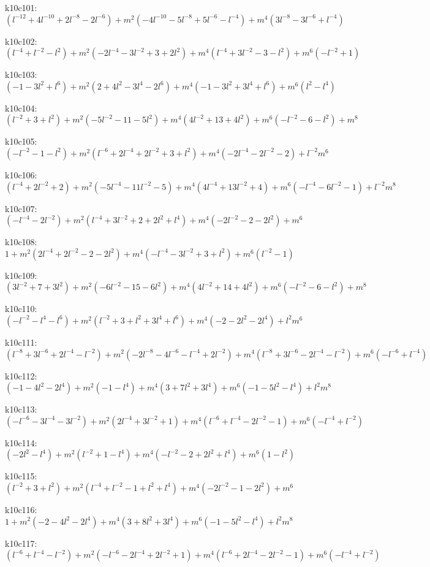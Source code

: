 k10c101: $ (l^{-12}+4l^{-10}+2l^{-8}-2l^{-6})  +m^{2}(-4l^{-10}-5l^{-8}+5l^{-6}-l^{-4})  +m^{4}(3l^{-8}-3l^{-6}+l^{-4}) $ 

k10c102: $ (l^{-4}+l^{-2}-l^{2})  +m^{2}(-2l^{-4}-3l^{-2}+3+2l^{2})  +m^{4}(l^{-4}+3l^{-2}-3-l^{2})  +m^{6}(-l^{-2}+1) $ 

k10c103: $ (-1-3l^{2}+l^{6})  +m^{2}(2+4l^{2}-3l^{4}-2l^{6})  +m^{4}(-1-3l^{2}+3l^{4}+l^{6})  +m^{6}(l^{2}-l^{4}) $ 

k10c104: $ (l^{-2}+3+l^{2})  +m^{2}(-5l^{-2}-11-5l^{2})  +m^{4}(4l^{-2}+13+4l^{2})  +m^{6}(-l^{-2}-6-l^{2})  +m^{8} $ 

k10c105: $ (-l^{-2}-1-l^{2})  +m^{2}(l^{-6}+2l^{-4}+2l^{-2}+3+l^{2})  +m^{4}(-2l^{-4}-2l^{-2}-2)  +l^{-2}m^{6} $ 

k10c106: $ (l^{-4}+2l^{-2}+2)  +m^{2}(-5l^{-4}-11l^{-2}-5)  +m^{4}(4l^{-4}+13l^{-2}+4)  +m^{6}(-l^{-4}-6l^{-2}-1)  +l^{-2}m^{8} $ 

k10c107: $ (-l^{-4}-2l^{-2})  +m^{2}(l^{-4}+3l^{-2}+2+2l^{2}+l^{4})  +m^{4}(-2l^{-2}-2-2l^{2})  +m^{6} $ 

k10c108: $ 1  +m^{2}(2l^{-4}+2l^{-2}-2-2l^{2})  +m^{4}(-l^{-4}-3l^{-2}+3+l^{2})  +m^{6}(l^{-2}-1) $ 

k10c109: $ (3l^{-2}+7+3l^{2})  +m^{2}(-6l^{-2}-15-6l^{2})  +m^{4}(4l^{-2}+14+4l^{2})  +m^{6}(-l^{-2}-6-l^{2})  +m^{8} $ 

k10c110: $ (-l^{-2}-l^{4}-l^{6})  +m^{2}(l^{-2}+3+l^{2}+3l^{4}+l^{6})  +m^{4}(-2-2l^{2}-2l^{4})  +l^{2}m^{6} $ 

k10c111: $ (l^{-8}+3l^{-6}+2l^{-4}-l^{-2})  +m^{2}(-2l^{-8}-4l^{-6}-l^{-4}+2l^{-2})  +m^{4}(l^{-8}+3l^{-6}-2l^{-4}-l^{-2})  +m^{6}(-l^{-6}+l^{-4}) $ 

k10c112: $ (-1-4l^{2}-2l^{4})  +m^{2}(-1-l^{4})  +m^{4}(3+7l^{2}+3l^{4})  +m^{6}(-1-5l^{2}-l^{4})  +l^{2}m^{8} $ 

k10c113: $ (-l^{-6}-3l^{-4}-3l^{-2})  +m^{2}(2l^{-4}+3l^{-2}+1)  +m^{4}(l^{-6}+l^{-4}-2l^{-2}-1)  +m^{6}(-l^{-4}+l^{-2}) $ 

k10c114: $ (-2l^{2}-l^{4})  +m^{2}(l^{-2}+1-l^{4})  +m^{4}(-l^{-2}-2+2l^{2}+l^{4})  +m^{6}(1-l^{2}) $ 

k10c115: $ (l^{-2}+3+l^{2})  +m^{2}(l^{-4}+l^{-2}-1+l^{2}+l^{4})  +m^{4}(-2l^{-2}-1-2l^{2})  +m^{6} $ 

k10c116: $ 1  +m^{2}(-2-4l^{2}-2l^{4})  +m^{4}(3+8l^{2}+3l^{4})  +m^{6}(-1-5l^{2}-l^{4})  +l^{2}m^{8} $ 

k10c117: $ (l^{-6}+l^{-4}-l^{-2})  +m^{2}(-l^{-6}-2l^{-4}+2l^{-2}+1)  +m^{4}(l^{-6}+2l^{-4}-2l^{-2}-1)  +m^{6}(-l^{-4}+l^{-2}) $ 

